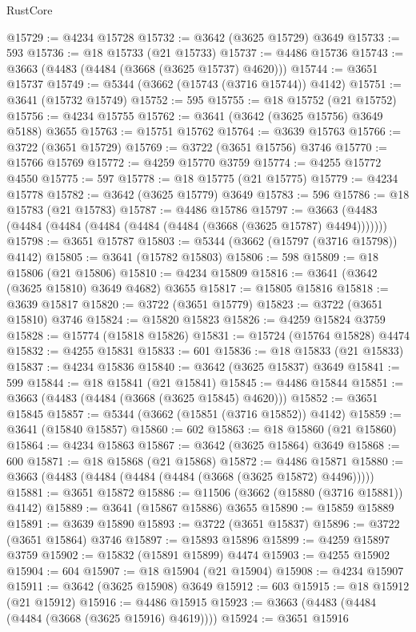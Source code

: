 \begin{lexlean}{RustCore}
\begin{coremodule}
@15729 := @4234 @15728
@15732 := @3642 (@3625 @15729) @3649
@15733 := 593
@15736 := @18 @15733 (@21 @15733)
@15737 := @4486 @15736
@15743 := @3663 (@4483 (@4484 (@3668 (@3625 @15737) @4620)))
@15744 := @3651 @15737
@15749 := @5344 (@3662 (@15743 (@3716 @15744)) @4142)
@15751 := @3641 (@15732 @15749)
@15752 := 595
@15755 := @18 @15752 (@21 @15752)
@15756 := @4234 @15755
@15762 := @3641 (@3642 (@3625 @15756) @3649 @5188) @3655
@15763 := @15751 @15762
@15764 := @3639 @15763
@15766 := @3722 (@3651 @15729)
@15769 := @3722 (@3651 @15756) @3746
@15770 := @15766 @15769
@15772 := @4259 @15770 @3759
@15774 := @4255 @15772 @4550
@15775 := 597
@15778 := @18 @15775 (@21 @15775)
@15779 := @4234 @15778
@15782 := @3642 (@3625 @15779) @3649
@15783 := 596
@15786 := @18 @15783 (@21 @15783)
@15787 := @4486 @15786
@15797 := @3663 (@4483 (@4484 (@4484 (@4484 (@4484 (@4484 (@3668 (@3625 @15787) @4494)))))))
@15798 := @3651 @15787
@15803 := @5344 (@3662 (@15797 (@3716 @15798)) @4142)
@15805 := @3641 (@15782 @15803)
@15806 := 598
@15809 := @18 @15806 (@21 @15806)
@15810 := @4234 @15809
@15816 := @3641 (@3642 (@3625 @15810) @3649 @4682) @3655
@15817 := @15805 @15816
@15818 := @3639 @15817
@15820 := @3722 (@3651 @15779)
@15823 := @3722 (@3651 @15810) @3746
@15824 := @15820 @15823
@15826 := @4259 @15824 @3759
@15828 := @15774 (@15818 @15826)
@15831 := @15724 (@15764 @15828) @4474
@15832 := @4255 @15831
@15833 := 601
@15836 := @18 @15833 (@21 @15833)
@15837 := @4234 @15836
@15840 := @3642 (@3625 @15837) @3649
@15841 := 599
@15844 := @18 @15841 (@21 @15841)
@15845 := @4486 @15844
@15851 := @3663 (@4483 (@4484 (@3668 (@3625 @15845) @4620)))
@15852 := @3651 @15845
@15857 := @5344 (@3662 (@15851 (@3716 @15852)) @4142)
@15859 := @3641 (@15840 @15857)
@15860 := 602
@15863 := @18 @15860 (@21 @15860)
@15864 := @4234 @15863
@15867 := @3642 (@3625 @15864) @3649
@15868 := 600
@15871 := @18 @15868 (@21 @15868)
@15872 := @4486 @15871
@15880 := @3663 (@4483 (@4484 (@4484 (@4484 (@3668 (@3625 @15872) @4496)))))
@15881 := @3651 @15872
@15886 := @11506 (@3662 (@15880 (@3716 @15881)) @4142)
@15889 := @3641 (@15867 @15886) @3655
@15890 := @15859 @15889
@15891 := @3639 @15890
@15893 := @3722 (@3651 @15837)
@15896 := @3722 (@3651 @15864) @3746
@15897 := @15893 @15896
@15899 := @4259 @15897 @3759
@15902 := @15832 (@15891 @15899) @4474
@15903 := @4255 @15902
@15904 := 604
@15907 := @18 @15904 (@21 @15904)
@15908 := @4234 @15907
@15911 := @3642 (@3625 @15908) @3649
@15912 := 603
@15915 := @18 @15912 (@21 @15912)
@15916 := @4486 @15915
@15923 := @3663 (@4483 (@4484 (@4484 (@3668 (@3625 @15916) @4619))))
@15924 := @3651 @15916

\end{coremodule}
\end{lexlean}
